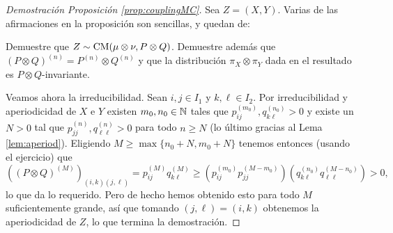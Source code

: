 \begin{proof}[Demostración Proposición \ref{prop:couplingMC}]
Sea $Z=(X,Y)$.
Varias de las afirmaciones en la proposición son sencillas, y quedan de:
\begin{exer}
Demuestre que $Z\sim\text{\upshape{CM}}(\mu\otimes\nu,P\otimes Q)$.
Demuestre además que $(P\otimes Q)^{(n)}=P^{(n)}\otimes Q^{(n)}$ y que la distribución $\pi_X\otimes\pi_Y$ dada en el resultado es $P\otimes Q$-invariante.
\end{exer}
\noindent Veamos ahora la irreducibilidad.
Sean $i,j\in I_1$ y $k,\ell\in I_2$.
Por irreducibilidad y aperiodicidad de $X$ e $Y$ existen $m_0,n_0\in\mathbb{N}$ tales que $p^{(m_0)}_{ij},q^{(n_0)}_{k\ell}>0$ y existe un $N>0$ tal que $p^{(n)}_{jj},q^{(n)}_{\ell\ell}>0$ para todo $n\geq N$ (lo último gracias al Lema \ref{lem:aperiod}).
Eligiendo $M\geq\max\{n_0+N,m_0+N\}$ tenemos entonces (usando el ejercicio) que
\[((P\otimes Q)^{(M)})_{(i,k)(j,\ell)}=p^{(M)}_{ij}q^{(M)}_{k\ell}\geq(p^{(m_0)}_{ij}p^{(M-m_0)}_{jj})(q^{(n_0)}_{k\ell}q^{(M-n_0)}_{\ell\ell})>0,\]
lo que da lo requerido.
Pero de hecho hemos obtenido esto para todo $M$ suficientemente grande, así que tomando $(j,\ell)=(i,k)$ obtenemos la aperiodicidad de $Z$, lo que termina la demostración.
\end{proof}

